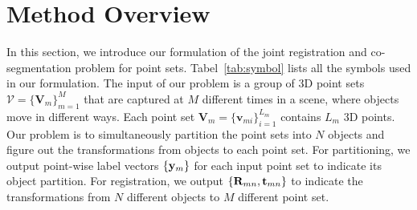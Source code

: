 \section{Method Overview}
\label{sec:method}
In this section, we introduce our formulation of the joint registration and co-segmentation problem for point sets. Tabel~\ref{tab:symbol} lists all the symbols used in our formulation. The input of our problem is a group of 3D point sets  $\mathcal{V}=\{\mathbf{V}_m\}^{M}_{m=1}$ that are captured at $M$ different times in a scene, where objects move in different ways. Each point set $\mathbf{V}_m=\{\mathbf{v}_{mi}\}^{L_m}_{i=1}$ contains $L_m$ 3D points. Our problem is to simultaneously partition the point sets into $N$ objects and figure out the transformations from objects to each point set. For partitioning, we output point-wise label vectors $\{\mathbf{y}_m\}$ for each input point set to indicate its object partition. For registration, we output $\{\mathbf{R}_{mn},\mathbf{t}_{mn}\}$ to indicate the transformations from $N$ different objects to $M$ different point set.
